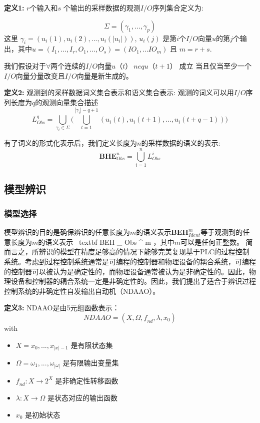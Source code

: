 \textbf{定义1:} \( r \)个输入和$ s $ 个输出的采样数据的观测$I/O$序列集合定义为:

\begin{equation} 
\Sigma = (\gamma_1,...,\gamma_p) 
\end{equation} 这里 $\gamma_i = (u_i(1),u_i(2),...,u_i(|u_i|))$, $ u_i(j) $ 是第$i$个$I/O$向量$u$的第$j$个输出，其中$ u = (I_1,...,I_r,O_1,...,O_s) = (IO_1,...IO_m) $ 且 $ m=r+s $.

我们假设对于$ \forall $两个连续的$I/O$向量$ u（t）\ neq u（t + 1）$ 成立
当且仅当至少一个$I/O$向量分量改变且$I/O$向量是新生成的。

\textbf{定义2:} 观测到的采样数据词义集合表示和语义集合表示: 观测的词义可以用$I/O$序列长度为$q$的观测向量集合描述 
\[
L_{Obs}^q = \bigcup_{\gamma_i \in \Sigma} \Big(\bigcup_{t=1}^{|\gamma_i|-q+1} (u_i(t),u_i(t+1),...,u_i(t+q-1))\Big) 
\]

有了词义的形式化表示后，我们定义长度为$n$的采样数据的语义的表示:
\begin{equation}
 \textbf{BHE}_{Obs}^n = \bigcup_{i=1}^n L_{Obs}^i 
\end{equation}

\subsection{模型辨识}

\subsubsection{模型选择}

模型辨识的目的是确保辨识的任意长度为$ m $的语义表示$ \textbf {BEH}_{Ident}^m $等于观测到的任意长度为$ m $的语义表示  \（\ textbf {BEH} _ {Obs} ^ m \），其中$ m $可以是任何正整数。 简而言之，所辨识的模型在精度足够高的情况下能够完美复现基于PLC的过程控制系统。考虑到过程控制系统通常是可编程的控制器和物理设备的耦合系统，可编程的控制器可以被认为是确定性的，而物理设备通常被认为是非确定性的。因此，物理设备和控制器的耦合系统一定是非确定性的。因此，我们提出了适合于辨识过程控制系统的非确定性自发输出自动机（NDAAO）\cite {klein2005}。

\textbf{定义3:} NDAAO是由5元组函数表示： \[ NDAAO=(X,\Omega,\textit{f}_{nd},\lambda,x_0) \] with\
\begin{itemize}
  \item $ X={x_0,...,x_{|x|-1}} $ 是有限状态集
  \item $ \Omega={\omega_1,...,\omega_{|\omega|}} $ 是有限输出变量集
  \item $ \textit{f}_{nd}: X\rightarrow 2^X $ 是非确定性转移函数
  \item $ \lambda: X\rightarrow \Omega $ 是状态对应的输出函数
  \item $x_0$ 是初始状态
\end{itemize}

